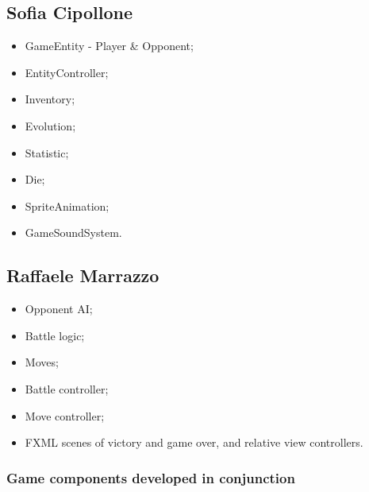 \documentclass[12pt, a4paper]{report}
\theoremstyle{definition}
\begin{document}
    \subsection*{Sofia Cipollone}

    \begin{itemize}
        \item GameEntity - Player \& Opponent;
        \item EntityController;
        \item Inventory;
        \item Evolution;
        \item Statistic;
        \item Die;
        \item SpriteAnimation;
        \item GameSoundSystem.
    \end{itemize}

    \subsection*{Raffaele Marrazzo}

    \begin{itemize}
        \item Opponent AI;
        \item Battle logic;
        \item Moves;
        \item Battle controller;
        \item Move controller;
        \item FXML scenes of victory and game over, and relative view controllers.
    \end{itemize}

    \subsubsection*{Game components developed in conjunction}
\end{document}
